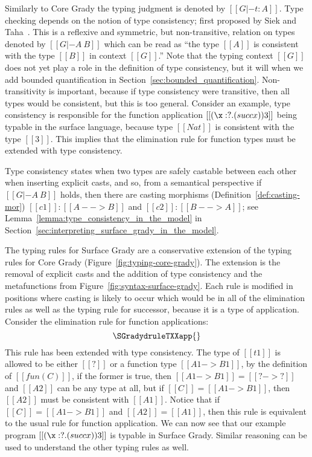 Similarly to Core Grady the typing judgment is denoted by $[[G |- t :
    A]]$.  Type checking depends on the notion of type consistency;
first proposed by Siek and Taha~\cite{Siek:2006}.  This is a reflexive
and symmetric, but non-transitive, relation on types denoted by $[[G
    |- A ~ B]]$ which can be read as ``the type $[[A]]$ is consistent
with the type $[[B]]$ in context $[[G]]$.''  Note that the typing
context $[[G]]$ does not yet play a role in the definition of type
consistency, but it will when we add bounded quantification in
Section~\ref{sec:bounded_quantification}.  Non-transitivity is
important, because if type consistency were transitive, then all types
would be consistent, but this is too general. Consider
an example, type consistency is responsible for the function
application $[[(\x:?.(succ x)) 3]]$ being typable in the surface
language, because type $[[Nat]]$ is consistent with the type $[[3]]$.
This implies that the elimination rule for function types must be
extended with type consistency.

Type consistency states when two types are safely castable between
each other when inserting explicit casts, and so, from a semantical
perspective if $[[G |- A ~ B]]$ holds, then there are casting
morphisms (Definition~\ref{def:casting-mor}) $[[c1]] : [[A --> B]]$
and $[[c2]] : [[B --> A]]$; see
Lemma~\ref{lemma:type_consistency_in_the_model} in
Section~\ref{sec:interpreting_surface_grady_in_the_model}.

The typing rules for Surface Grady are a conservative extension of the
typing rules for Core Grady (Figure~\ref{fig:typing-core-grady}). The
extension is the removal of explicit casts and the addition of type
consistency and the metafunctions from
Figure~\ref{fig:syntax-surface-grady}.  Each rule is modified in
positions where casting is likely to occur which would be in all of
the elimination rules as well as the typing rule for successor,
because it is a type of application.  Consider the elimination rule
for function applications:
\[
\SGradydruleTXXapp{}
\]
This rule has been extended with type consistency.  The type of
$[[t1]]$ is allowed to be either $[[?]]$ or a function type $[[A1 ->
    B1]]$, by the definition of $[[fun(C)]]$, if the former is true,
then $[[A1 -> B1]] = [[? -> ?]]$ and $[[A2]]$ can be any type at all,
but if $[[C]] = [[A1 -> B1]]$, then $[[A2]]$ must be consistent with
$[[A1]]$.  Notice that if $[[C]] = [[A1 -> B1]]$ and $[[A2]] =
[[A1]]$, then this rule is equivalent to the usual rule for function
application. We can now see that our example program $[[(\x:?.(succ
    x)) 3]]$ is typable in Surface Grady.  Similar reasoning can be
used to understand the other typing rules as well.

